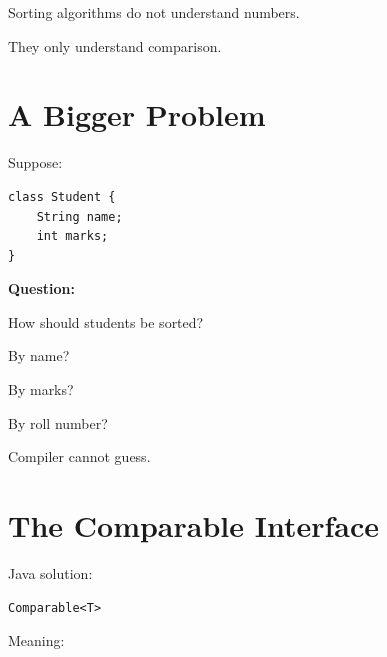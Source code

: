 \documentclass[11pt,a4paper]{book}
\begin{document}
Sorting algorithms do not
understand numbers.


They only understand comparison.


\section{A Bigger Problem}

Suppose:

\begin{verbatim} 
class Student {
    String name;
    int marks;
}
\end{verbatim}


\textbf{Question:}


How should students be sorted?


By name?


By marks?


By roll number?


Compiler cannot guess.


\section{The Comparable Interface}

Java solution:

\begin{verbatim} 
Comparable<T>
\end{verbatim}


Meaning:

\end{document}
